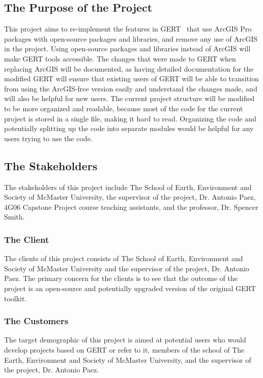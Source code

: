 \documentclass[12pt, titlepage]{article}
\begin{document}
    \subsection{The Purpose of the Project}
This project aims to re-implement the features in GERT~\citep{DALUMPINES2018121} that use ArcGIS Pro packages with
open-source packages and libraries, and remove any use of ArcGIS in the project. Using open-source packages and libraries instead of ArcGIS will make GERT tools accessible. The changes that were made to GERT when replacing ArcGIS will be documented, as having detailed documentation for the modified GERT will ensure that existing users of GERT will be able to transition from using the ArcGIS-free version easily and understand the changes made, and will also be helpful for new users. The current project structure will be modified to be more organized and readable, because most of the code for the current project is stored in a single file, making it hard to read. Organizing the code and potentially splitting up the code into separate modules would be helpful for any users trying to use the code.

\subsection{The Stakeholders}

The stakeholders of this project include The School of Earth, Environment and Society of McMaster University, the supervisor of the project, Dr. Antonio Paez, 4G06 Capstone Project course teaching assistants, and the professor, Dr. Spencer Smith. 

\subsubsection{The Client}

The clients of this project consists of The School of Earth, Environment and Society of McMaster University and the supervisor of the project, Dr. Antonio Paez. The primary concern for the clients is to see that the outcome of the project is an open-source and potentially upgraded version of the original GERT toolkit.

\subsubsection{The Customers}

The target demographic of this project is aimed at potential users who would develop projects based on GERT or refer to it, members of the school of The Earth, Environment and Society of McMaster University, and the supervisor of the project, Dr. Antonio Paez.
\end{document}
